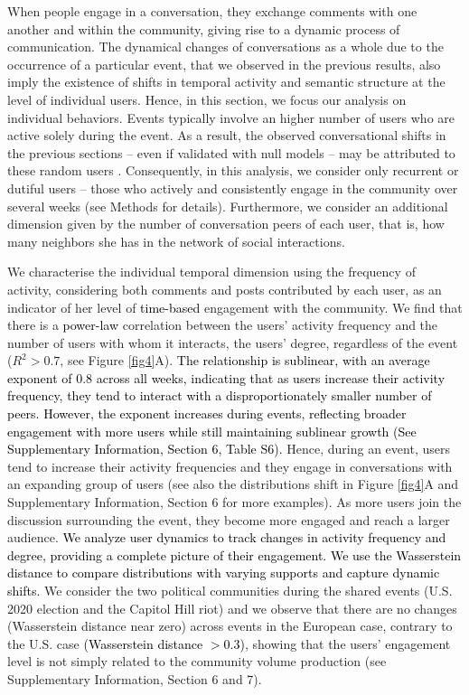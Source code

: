 \documentclass[fleqn,10pt]{wlscirep}
\newcommand{\new}[1]{\textcolor{black}{#1}}
\begin{document}
When people engage in a conversation, they exchange comments with one another and within the community, giving rise to a dynamic process of communication.
The dynamical changes of conversations as a whole due to the occurrence of a particular event, that we observed in the previous results, also imply the existence of shifts in temporal activity and semantic structure at the level of individual users. 
Hence, in this section, we focus our analysis on individual behaviors. 
Events typically involve an higher number of users who are active solely during the event. 
As a result, the observed conversational shifts in the previous sections -- even if validated with null models -- may be attributed to these random users \cite{szell_contraction_2014}.
Consequently, in this analysis, we consider only recurrent or dutiful users -- those who actively and consistently engage in the community over several weeks (see Methods for details).
Furthermore, we consider an additional dimension given by the number of conversation peers of each user, that is, how many neighbors she has in the network of social interactions.

%
We characterise the individual temporal dimension using the frequency of activity, considering both comments and posts contributed by each user, as an indicator of her level of \new{time-based} engagement with the community.
We find that there is a \new{power-law} correlation between the users' activity frequency and the number of users with whom it interacts, the users' degree, regardless of the event ($R^2 > 0.7$, see Figure \ref{fig4}A).
\new{
The relationship is sublinear, with an average exponent of 0.8 across all weeks, indicating that as users increase their activity frequency, they tend to interact with a disproportionately smaller number of peers.
However, the exponent increases during events, reflecting broader engagement with more users while still maintaining sublinear growth (See Supplementary Information, Section 6, Table S6).
}
Hence, during an event, users tend to increase their activity frequencies and they engage in conversations with an expanding group of users (see also the distributions shift in Figure \ref{fig4}A and Supplementary Information, Section 6 for more examples). 
As more users join the discussion surrounding the event, they become more engaged and reach a larger audience.
\new{
We analyze user dynamics to track changes in activity frequency and degree, providing a complete picture of their engagement. 
We use the Wasserstein distance \cite{kantorovich1960mathematical} to compare distributions with varying supports and capture dynamic shifts.
}
We consider the two political communities during the shared events (U.S. 2020 election and the Capitol Hill riot) and we observe that there are no changes (Wasserstein distance near zero) across events in the European case, contrary to the U.S. case \new{(Wasserstein distance $>0.3$)}, showing that the users' engagement level is not simply related to the community volume production (see Supplementary Information, Section 6 and 7).
\end{document}

